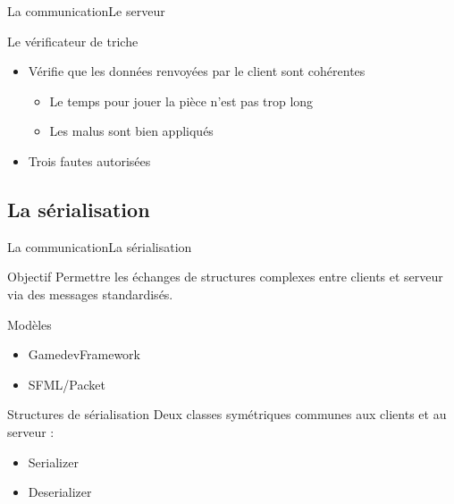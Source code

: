 \documentclass[french]{beamer}
\begin{document}
	\begin{frame}{La communication}{Le serveur}
		\begin{block}{Le vérificateur de triche}
			\begin{itemize}
				\item Vérifie que les données renvoyées par le client sont cohérentes
				\begin{itemize}
					\item Le temps pour jouer la pièce n'est pas trop long
					\item Les malus sont bien appliqués
				\end{itemize}
				\item Trois fautes autorisées
			\end{itemize}
		\end{block}


	\end{frame}
























	\subsection{La sérialisation}

		\begin{frame}{La communication}{La sérialisation}
	        \begin{block}{Objectif}
	            Permettre les échanges de structures complexes entre clients et serveur via des messages standardisés.
	        \end{block}

	        \begin{block}{Modèles}
	            \begin{itemize}
	                \item GamedevFramework
	                \item SFML/Packet
	            \end{itemize}
	        \end{block}

	        \begin{block}{Structures de sérialisation}
	            Deux classes symétriques communes aux clients et au serveur : 
	            \begin{itemize}
	                \item Serializer
	                \item Deserializer
	            \end{itemize}
	        \end{block}     

	    \end{frame}
\end{document}
